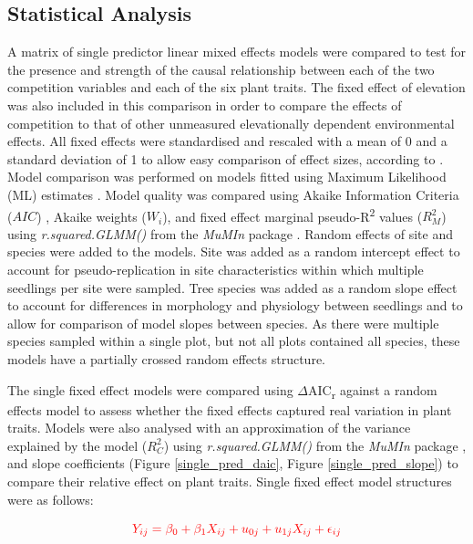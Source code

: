 \documentclass[a4paper, 11pt]{article}
\newcommand{\todo}[1]{\textcolor{red}{#1}}   %
\begin{document}



\subsection{Statistical Analysis}

A matrix of single predictor linear mixed effects models were compared to test for the presence and strength of the causal relationship between each of the two competition variables and each of the six plant traits. The fixed effect of elevation was also included in this comparison in order to compare the effects of competition to that of other unmeasured elevationally dependent environmental effects. All fixed effects were standardised and rescaled with a mean of 0 and a standard deviation of 1 to allow easy comparison of effect sizes, according to \citep{Grueber2011}. Model comparison was performed on models fitted using Maximum Likelihood (ML) estimates \citep{Bolker2008}. Model quality was compared using Akaike Information Criteria ($AIC$) \citep{Akaike1992}, Akaike weights ($W_i$), and fixed effect marginal pseudo-R\textsuperscript{2} values ($R_M^2$) using \textit{r.squared.GLMM()} from the \textit{MuMIn} package \citep{MuMIn}. Random effects of site and species were added to the models. Site was added as a random intercept effect to account for pseudo-replication in site characteristics within which multiple seedlings per site were sampled. Tree species was added as a random slope effect to account for differences in morphology and physiology between seedlings and to allow for comparison of model slopes between species. As there were multiple species sampled within a single plot, but not all plots contained all species, these models have a partially crossed random effects structure.

The single fixed effect models were compared using $\Delta$AIC\textsubscript{r} against a random effects model to assess whether the fixed effects captured real variation in plant traits. Models were also analysed with an approximation of the variance explained by the model ($R_C^2$) using \textit{r.squared.GLMM()} from the \textit{MuMIn} package \citep{MuMIn}, and slope coefficients (Figure \ref{single_pred_daic}, Figure \ref{single_pred_slope}) to compare their relative effect on plant traits. Single fixed effect model structures were as follows:

\begin{equation}
\label{eq:slope_model}
\todo{Y_{ij} = \beta_{0} + \beta_{1}X_{ij} + u_{0j} + u_{1j}X_{ij} + \epsilon_{ij}}
\end{equation}
\end{document}

